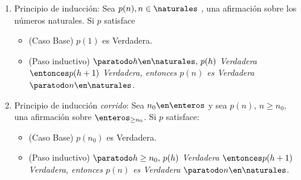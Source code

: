 \begin{enumerate}
  \item Principio de inducción: Sea $p(n), n \in \naturales$ , una afirmación sobre los números naturales.
        Si $p$ satisface
        \begin{itemize}
          \item (Caso Base) $p(1)$ es Verdadera.
          \item (Paso inductivo) $\paratodo h \en \naturales,\, p(h)$ \textit{Verdadera}
                $\entonces p(h+1)$ \textit{Verdadera, entonces $p(n)$ es Verdadera} $\paratodo n \en \naturales$.
        \end{itemize}

  \item Principio de inducción \textit{corrido}: Sea $n_0 \en \enteros$ y sea $p(n),\, n\geq n_0,\,$ una afirmación sobre $\enteros_{\geq n_0}$. Si $p$
        satisface:
        \begin{itemize}
          \item (Caso Base) $p(n_0)$ es Verdadera.
          \item (Paso inductivo) $\paratodo h \geq n_0,\, p(h)$ \textit{Verdadera}
                $\entonces p(h+1)$ \textit{Verdadera, entonces $p(n)$ es Verdadera} $\paratodo n \en \naturales$.
        \end{itemize}
\end{enumerate}

